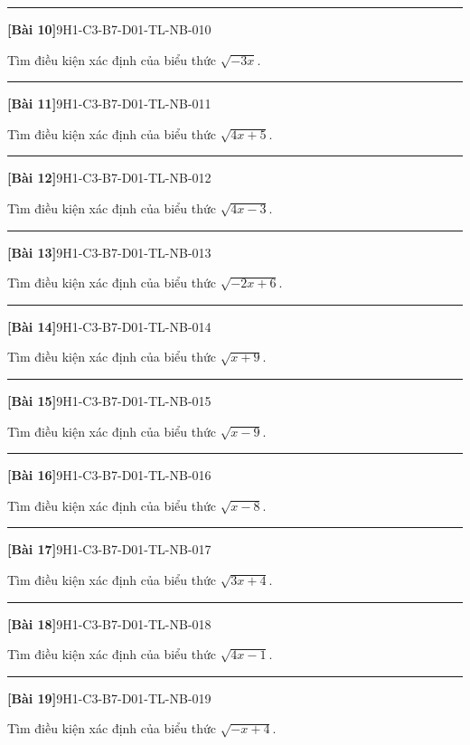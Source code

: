 \documentclass[12pt,a4paper]{article}
\newif\ifloigiai
\newenvironment{cauhoi}[2]{%
  \par\medskip\noindent\rule{\textwidth}{0.4pt}\par\nopagebreak
  \noindent\textbf{[#1]}\hfill{\scriptsize\ttfamily #2}\par\nopagebreak\smallskip}{\par}
\newcommand{\loigiai}[1]{\ifloigiai\par\smallskip\noindent\textit{Lời giải.} #1\par\fi}
\begin{document}
\begin{cauhoi}{Bài 10}{9H1-C3-B7-D01-TL-NB-010}
Tìm điều kiện xác định của biểu thức $\sqrt{-3x}$.
\loigiai{Biểu thức xác định khi $-3x\ge 0$, tức là $3x\le 0$, suy ra $x\le 0$.}
\end{cauhoi}
\begin{cauhoi}{Bài 11}{9H1-C3-B7-D01-TL-NB-011}
Tìm điều kiện xác định của biểu thức $\sqrt{4x + 5}$.
\loigiai{Biểu thức xác định khi $4x + 5\ge 0$, tức là $x\ge -\dfrac{5}{4}$.}
\end{cauhoi}
\begin{cauhoi}{Bài 12}{9H1-C3-B7-D01-TL-NB-012}
Tìm điều kiện xác định của biểu thức $\sqrt{4x - 3}$.
\loigiai{Biểu thức xác định khi $4x - 3\ge 0$, tức là $x\ge \dfrac{3}{4}$.}
\end{cauhoi}
\begin{cauhoi}{Bài 13}{9H1-C3-B7-D01-TL-NB-013}
Tìm điều kiện xác định của biểu thức $\sqrt{-2x + 6}$.
\loigiai{Biểu thức xác định khi $-2x + 6\ge 0$, tức là $2x\le 6$, suy ra $x\le 3$.}
\end{cauhoi}
\begin{cauhoi}{Bài 14}{9H1-C3-B7-D01-TL-NB-014}
Tìm điều kiện xác định của biểu thức $\sqrt{x + 9}$.
\loigiai{Biểu thức xác định khi $x + 9\ge 0$, tức là $x\ge -9$.}
\end{cauhoi}
\begin{cauhoi}{Bài 15}{9H1-C3-B7-D01-TL-NB-015}
Tìm điều kiện xác định của biểu thức $\sqrt{x - 9}$.
\loigiai{Biểu thức xác định khi $x - 9\ge 0$, tức là $x\ge 9$.}
\end{cauhoi}
\begin{cauhoi}{Bài 16}{9H1-C3-B7-D01-TL-NB-016}
Tìm điều kiện xác định của biểu thức $\sqrt{x - 8}$.
\loigiai{Biểu thức xác định khi $x - 8\ge 0$, tức là $x\ge 8$.}
\end{cauhoi}
\begin{cauhoi}{Bài 17}{9H1-C3-B7-D01-TL-NB-017}
Tìm điều kiện xác định của biểu thức $\sqrt{3x + 4}$.
\loigiai{Biểu thức xác định khi $3x + 4\ge 0$, tức là $x\ge -\dfrac{4}{3}$.}
\end{cauhoi}
\begin{cauhoi}{Bài 18}{9H1-C3-B7-D01-TL-NB-018}
Tìm điều kiện xác định của biểu thức $\sqrt{4x - 1}$.
\loigiai{Biểu thức xác định khi $4x - 1\ge 0$, tức là $x\ge \dfrac{1}{4}$.}
\end{cauhoi}
\begin{cauhoi}{Bài 19}{9H1-C3-B7-D01-TL-NB-019}
Tìm điều kiện xác định của biểu thức $\sqrt{-x + 4}$.
\loigiai{Biểu thức xác định khi $-x + 4\ge 0$, tức là $x\le 4$, suy ra $x\le 4$.}
\end{cauhoi}
\end{document}

